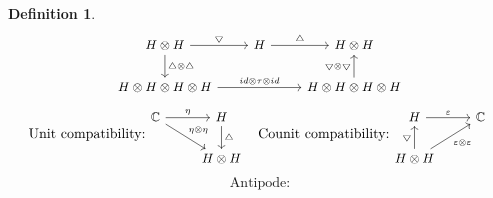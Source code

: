 \documentclass[12pt,a4paper]{article}
\newtheorem{definition}[theorem]{Definition}
\newcommand\1{_{(1)}}
\newcommand\2{_{(2)}}
\begin{document}
\begin{definition}
\[\begin{small}
\begin{tikzcd}
H\otimes H \arrow[d, "\triangle\otimes\triangle"] \arrow[r, "\bigtriangledown"] & H \arrow[r, "\triangle"] & H\otimes H                                                                  \\
H\otimes H\otimes H\otimes H \arrow[rr, "id\otimes\tau\otimes id"]           &                          & H\otimes H\otimes H\otimes H \arrow[u, "\bigtriangledown\otimes\bigtriangledown"]
\end{tikzcd}
\end{small}
\]
\vspace{4ex}
\[
\text{Unit compatibility:}
\begin{small}
\begin{tikzcd}
\mathbb{C} \arrow[rd, "\eta\otimes\eta"] \arrow[r, "\eta"] & H \arrow[d, "\triangle"] \\
                                                    & H\otimes H              
\end{tikzcd}
\end{small}
\text{\;\;\;Counit compatibility:}
\begin{small}
\begin{tikzcd}
H \arrow[r, "\varepsilon"]                                                         & \mathbb{C} \\
H\otimes H \arrow[u, "\bigtriangledown"] \arrow[ru, "\varepsilon\otimes\varepsilon"'] &    
\end{tikzcd}
\end{small}
\]
\vspace{4ex}
\[
\text{Antipode:}
\]
\end{definition}
\end{document}
